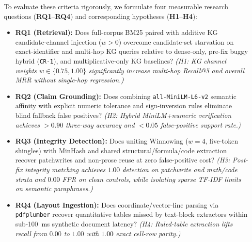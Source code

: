 \documentclass[conference]{IEEEtran}
\begin{document}
To evaluate these criteria rigorously, we formulate four measurable research questions (\textbf{RQ1}--\textbf{RQ4}) and corresponding hypotheses (\textbf{H1}--\textbf{H4}):
\begin{itemize}
  \item \textbf{RQ1 (Retrieval):} Does full-corpus BM25 paired with additive KG candidate-channel injection ($w > 0$) overcome candidate-set starvation on exact-identifier and multi-hop KG queries relative to dense-only, pre-fix buggy hybrid (\texttt{CR-1}), and multiplicative-only KG baselines? \emph{(H1: KG channel weights $w \in \{0.75, 1.00\}$ significantly increase multi-hop Recall@5 and overall MRR without single-hop regression.)}
  \item \textbf{RQ2 (Claim Grounding):} Does combining \texttt{all-MiniLM-L6-v2} semantic affinity with explicit numeric tolerance and sign-inversion rules eliminate blind fallback false positives? \emph{(H2: Hybrid MiniLM+numeric verification achieves $>0.90$ three-way accuracy and $<0.05$ false-positive support rate.)}
  \item \textbf{RQ3 (Integrity Detection):} Does uniting Winnowing ($w{=}4$, five-token shingles) with MinHash and shared structural/formula/code extraction recover patchwrites and non-prose reuse at zero false-positive cost? \emph{(H3: Post-fix integrity matching achieves $1.00$ detection on patchwrite and math/code strata and $0.00$ FPR on clean controls, while isolating sparse TF-IDF limits on semantic paraphrases.)}
  \item \textbf{RQ4 (Layout Ingestion):} Does coordinate/vector-line parsing via \texttt{pdfplumber} recover quantitative tables missed by text-block extractors within sub-100~ms synthetic document latency? \emph{(H4: Ruled-table extraction lifts recall from $0.00$ to $1.00$ with $1.00$ exact cell-row parity.)}
\end{itemize}
\end{document}
